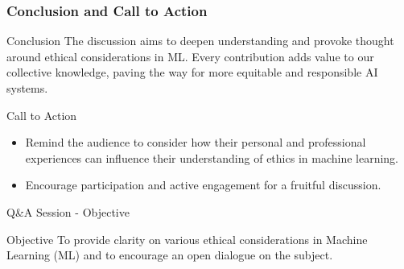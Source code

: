 \documentclass[aspectratio=169]{beamer}
\begin{document}
\begin{frame}[fragile]
    \frametitle{Conclusion and Call to Action}
    \begin{block}{Conclusion}
        The discussion aims to deepen understanding and provoke thought around ethical considerations in ML. Every contribution adds value to our collective knowledge, paving the way for more equitable and responsible AI systems.
    \end{block}
    
    \begin{block}{Call to Action}
        \begin{itemize}
            \item Remind the audience to consider how their personal and professional experiences can influence their understanding of ethics in machine learning.
            \item Encourage participation and active engagement for a fruitful discussion.
        \end{itemize}
    \end{block}
\end{frame}

\begin{frame}[fragile]{Q\&A Session - Objective}
    \begin{block}{Objective}
        To provide clarity on various ethical considerations in Machine Learning (ML) and to encourage an open dialogue on the subject.
    \end{block}
\end{frame}
\end{document}

